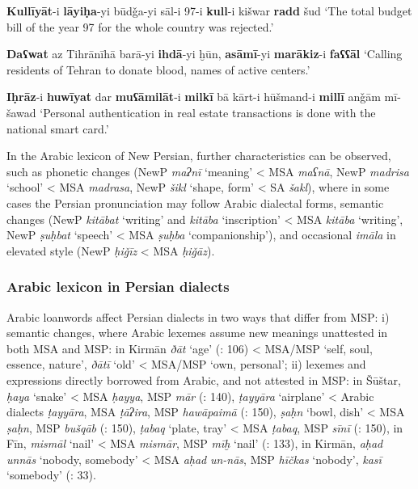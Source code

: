 \documentclass[output=paper]{langsci/langscibook}
\begin{document}
\ea
\ea \textbf{Kullīyāt}-i \textbf{lāyiḥa}-yi būdǧa-yi sāl-i 97-i \textbf{kull}-i kišwar \textbf{radd} šud
    \glt ‘The total budget bill of the year 97 for the whole country was rejected.’

\ex \textbf{Daʕwat} {az} {Tihrānīhā} barā-yi \textbf{ihdā}-yi ḫūn, \textbf{asāmī}-yi \textbf{marākiz}-i \textbf{faʕʕāl} 
    \glt ‘Calling residents of Tehran to donate blood, names of active centers.’

\ex \textbf{Iḥrāz}-i \textbf{huwīyat} dar \textbf{muʕāmilāt}-i \textbf{milkī} {bā} {kārt-i} hūšmand-i \textbf{millī} {anǧām} {mī-šawad} 
    \glt‘Personal authentication in real estate transactions is done with the national smart card.’
\z
\z


In the Arabic lexicon of New Persian, further characteristics can be observed, such as phonetic changes (NewP \textit{maʔnī} ‘meaning’ < MSA \textit{maʕnā}, NewP \textit{madrisa} ‘school’ < MSA \textit{madrasa}, NewP \textit{šikl} ‘shape, form’ < SA \textit{šakl}), where in some cases the Persian pronunciation may follow Arabic dialectal forms, semantic changes (NewP \textit{kitābat} ‘writing’ and \textit{kitāba} ‘inscription’ < MSA \textit{kitāba} ‘writing’, NewP \textit{ṣuḥbat} ‘speech’ < MSA \textit{ṣuḥba} ‘companionship’), and occasional \textit{imāla} in elevated style (NewP \textit{ḥiǧīz} < MSA \textit{ḥiǧāz}).

\subsubsection{Arabic lexicon in Persian dialects}

Arabic loanwords affect Persian dialects in two ways that differ from MSP: i) semantic changes, where Arabic lexemes assume new meanings unattested in both MSA and MSP: in Kirmān \textit{ðāt} ‘age’   (\citealt{Ṣarrāfī1996}: 106) < MSA/MSP ‘self, soul, essence, nature’, \textit{ðātī} ‘old’ < MSA/MSP ‘own, personal’; ii) lexemes and expressions directly borrowed from Arabic, and not attested in MSP: in Šūštar, \textit{ḥaya} ‘snake’ < MSA \textit{ḥayya}, MSP \textit{mār} (\citealt{Fāẓilī2004}: 140), \textit{ṭayyāra} ‘airplane’ < Arabic dialects \textit{ṭayyāra}, MSA \textit{ṭāʔira}, MSP \textit{hawāpaimā} (\citealt{Fāẓilī2004}: 150), \textit{ṣaḥn} ‘bowl, dish’ < MSA \textit{ṣaḥn}, MSP \textit{bušqāb} (\citealt{Fāẓilī2004}: 150), \textit{ṭabaq} ‘plate, tray’ < MSA \textit{ṭabaq}, MSP \textit{sīnī} (\citealt{Fāẓilī2004}: 150), in Fīn, \textit{mismāl} ‘nail’ < MSA \textit{mismār}, MSP \textit{mīḫ} ‘nail’ (\citealt{NaǧībiFīni2002}: 133), in Kirmān, \textit{aḥad} \textit{unnās} ‘nobody, somebody’ < MSA \textit{aḥad} \textit{un-nās}, MSP \textit{hīčkas} ‘nobody’, \textit{kasī} ‘somebody’ (\citealt{Ṣarrāfī1996}: 33).
\end{document}
